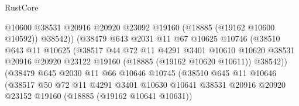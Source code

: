 \begin{lexlean}{RustCore}
\begin{coremodule}
                                    @10600
                                    @38531
                                    @20916
                                    @20920
                                    @23092
                                    @19160
                                    (@18885 (@19162 @10600 @10592))
                                    @38542))
                                (@38479
                                  @643
                                  @2031
                                  @11
                                  @67
                                  @10625
                                  @10746
                                  (@38510
                                    @643
                                    @11
                                    @10625
                                    (@38517
                                      @44
                                      @72
                                      @11
                                      @4291
                                      @3401
                                      @10610
                                      @10620
                                      @38531
                                      @20916
                                      @20920
                                      @23122
                                      @19160
                                      (@18885 (@19162 @10620 @10611))
                                      @38542))
                                  (@38479
                                    @645
                                    @2030
                                    @11
                                    @66
                                    @10646
                                    @10745
                                    (@38510
                                      @645
                                      @11
                                      @10646
                                      (@38517
                                        @50
                                        @72
                                        @11
                                        @4291
                                        @3401
                                        @10630
                                        @10641
                                        @38531
                                        @20916
                                        @20920
                                        @23152
                                        @19160
                                        (@18885 (@19162 @10641 @10631))

\end{coremodule}
\end{lexlean}

